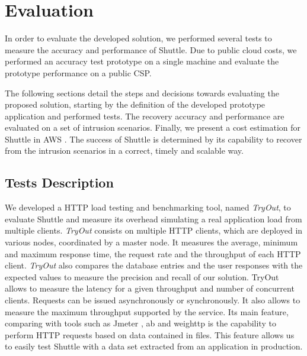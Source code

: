 \chapter{Evaluation}\label{chapter:evaluation}
In order to evaluate the developed solution, we performed several tests to measure the accuracy and performance of Shuttle. Due to public cloud costs, we performed an accuracy test prototype on a single machine and evaluate the prototype performance on a public \ac{CSP}.

The following sections detail the steps and decisions towards evaluating the proposed solution, starting by the definition of the developed prototype application and performed tests. The recovery accuracy and performance are evaluated on a set of intrusion scenarios. Finally, we present a cost estimation for Shuttle in \ac{AWS} \cite{aws}. The success of Shuttle is determined by its capability to recover from the intrusion scenarios in a correct, timely and scalable way.


\section{Tests Description}\label{sec:eval:test_description}

We developed a \ac{HTTP} load testing and benchmarking tool, named \emph{TryOut}, to evaluate Shuttle and measure its overhead simulating a real application load from multiple clients. \emph{TryOut} consists on multiple \ac{HTTP} clients, which are deployed in various nodes, coordinated by a master node. It measures the average, minimum and maximum response time, the request rate and the throughput of each \ac{HTTP} client. \emph{TryOut} also compares the database entries and the user responses with the expected values to measure the precision and recall of our solution. TryOut allows to measure the latency for a given throughput and number of concurrent clients. Requests can be issued asynchronously or synchronously. It also allows to measure the maximum throughput supported by the service. Its main feature, comparing with tools such as Jmeter \cite{jmeter}, ab \cite{ab} and weighttp \cite{weighttp} is the capability to perform \ac{HTTP} requests based on data contained in files. This feature allows us to easily test Shuttle with a data set extracted from an application in production.

